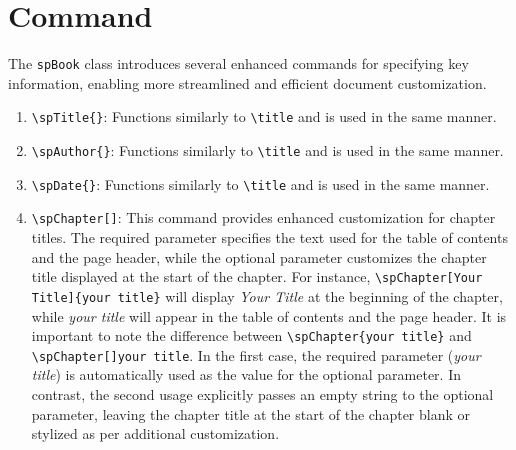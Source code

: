 \section{Command}
    The \texttt{spBook} class introduces several enhanced commands for specifying key information, enabling more streamlined and efficient document customization.
    \begin{enumerate}
        \item \texttt{\textbackslash spTitle\{\}}: Functions similarly to \texttt{\textbackslash title{}} and is used in the same manner.
        \item \texttt{\textbackslash spAuthor\{\}}: Functions similarly to \texttt{\textbackslash title{}} and is used in the same manner.
        \item \texttt{\textbackslash spDate\{\}}: Functions similarly to \texttt{\textbackslash title{}} and is used in the same manner.
        \item \texttt{\textbackslash spChapter[]{}}: This command provides enhanced customization for chapter titles. The required parameter specifies the text used for the table of contents and the page header, while the optional parameter customizes the chapter title displayed at the start of the chapter. For instance, \texttt{\textbackslash spChapter[Your Title]\{your title\}} will display \emph{Your Title} at the beginning of the chapter, while \emph{your title} will appear in the table of contents and the page header. It is important to note the difference between \texttt{\textbackslash spChapter\{your title\}} and \texttt{\textbackslash spChapter[]{your title}}. In the first case, the required parameter (\emph{your title}) is automatically used as the value for the optional parameter. In contrast, the second usage explicitly passes an empty string to the optional parameter, leaving the chapter title at the start of the chapter blank or stylized as per additional customization.
    \end{enumerate}
